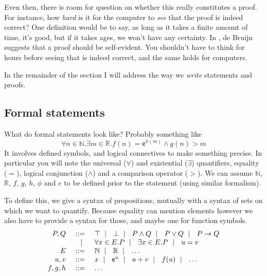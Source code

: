Even then, there is room for question on whether this really constitutes a
proof.
For instance, how \emph{hard} is it for the computer to \emph{see} that the
proof is indeed correct? One definition would be to say, as long as it takes
a finite amount of time, it's good, but if it takes ages, we won't have any
certainty. In , de Bruijn suggests that a proof should be
self-evident. You shouldn't have to think for hours before seeing that is indeed
correct, and the same holds for computers.

In the remainder of the section I will address the way we \emph{write}
statements and proofs.

\subsection{Formal statements}

What do formal statements look like? Probably something like
\[
  \forall n \in \mathbb{N}. \exists m \in \mathbb{R}.
  f(n) = \mathsf{e}^{\phi(m)} \wedge g(n) > m
\]
It involves defined symbols, and logical connectives to make something precise.
In particular you will note the universal (\(\forall\)) and existential
(\(\exists\)) quantifiers, equality (\(=\)), logical conjunction (\(\wedge\))
and a comparison operator (\(>\)).
We can assume \(\mathbb{N}\), \(\mathbb{R}\), \(f\), \(g\), \(h\), \(\phi\) and
\(e\) to be defined prior to the statement (using similar formalism).

To define this, we give a syntax of propositions, mutually with a syntax of
sets on which we want to quantify. Because equality can mention elements however
we also have to provide a syntax for those, and maybe one for function symbols.
\[
  \begin{array}{rrl}
    P, Q &\ \mathrel{{:}{:}{=}}\ & \top \ \mid\ \  \bot \ \mid\ \  P \wedge Q \ \mid\ \  P \vee Q
    \ \mid\ \  P \to Q \\
    &\ \mid\ \ & \forall x \in E. P \ \mid\ \  \exists x \in E. P \ \mid\ \  u = v \\
    E &\ \mathrel{{:}{:}{=}}\ & \mathbb{N} \ \mid\ \  \mathbb{R} \ \mid\ \  \dots \\
    u, v &\ \mathrel{{:}{:}{=}}\ & x \ \mid\ \  \mathsf{e}^u \ \mid\ \  u + v \ \mid\ \  f(u) \ \mid\ \  \dots \\
    f, g, h &\ \mathrel{{:}{:}{=}}\ & \dots
  \end{array}
\]

